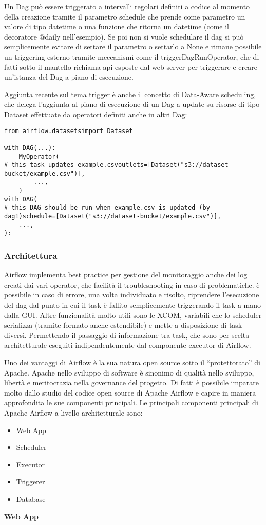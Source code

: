 \documentclass[a4paper,12pt]{report}
\begin{document}
Un Dag può essere triggerato a intervalli regolari definiti a codice al momento della creazione tramite il parametro schedule che prende come parametro un valore di tipo datetime o una funzione che ritorna un datetime (come il decoratore @daily nell’esempio). Se poi non si vuole schedulare il dag si può semplicemente evitare di settare il parametro o settarlo a None e rimane possibile un triggering esterno tramite meccanismi come il triggerDagRunOperator, che di fatti sotto il mantello richiama api esposte dal web server per triggerare e creare un’istanza del Dag a piano di esecuzione.

Aggiunta recente sul tema trigger è anche il concetto di Data-Aware scheduling, che delega l’aggiunta al piano di esecuzione di un Dag a update su risorse di tipo Dataset effettuate da operatori definiti anche in altri Dag:

\begin{verbatim}
from airflow.datasetsimport Dataset

with DAG(...):
    MyOperator(
# this task updates example.csvoutlets=[Dataset("s3://dataset-bucket/example.csv")],
        ...,
    )
with DAG(
# this DAG should be run when example.csv is updated (by dag1)schedule=[Dataset("s3://dataset-bucket/example.csv")],
    ...,
):
\end{verbatim}

\subsubsection{Architettura}
Airflow implementa best practice per gestione del monitoraggio anche dei log creati dai vari operator, che facilità il troubleshooting in caso di problematiche. è possibile in caso di errore, una volta individuato e risolto, riprendere l’esecuzione del dag dal punto in cui il task è fallito semplicemente triggerando il task a mano dalla GUI.
Altre funzionalità molto utili sono le XCOM, variabili che lo scheduler serializza (tramite formato anche estendibile) e mette a disposizione di task diversi. Permettendo il passaggio di informazione tra task, che sono per scelta architetturale eseguiti indipendentemente dal componente executor di Airflow.


Uno dei vantaggi di Airflow è la sua natura open source sotto il “protettorato” di Apache. Apache nello sviluppo di software è sinonimo di qualità nello sviluppo, libertà e meritocrazia nella governance del progetto. Di fatti è possibile imparare molto dallo studio del codice open source di Apache Airflow e capire in maniera approfondita le sue componenti principali.
Le principali componenti principali di Apache Airflow a livello architetturale sono:
\begin{itemize} 
\item Web App
\item Scheduler
\item Executor
\item Triggerer
\item Database

\end{itemize}
\noindent
\textbf{Web App}
\end{document}
